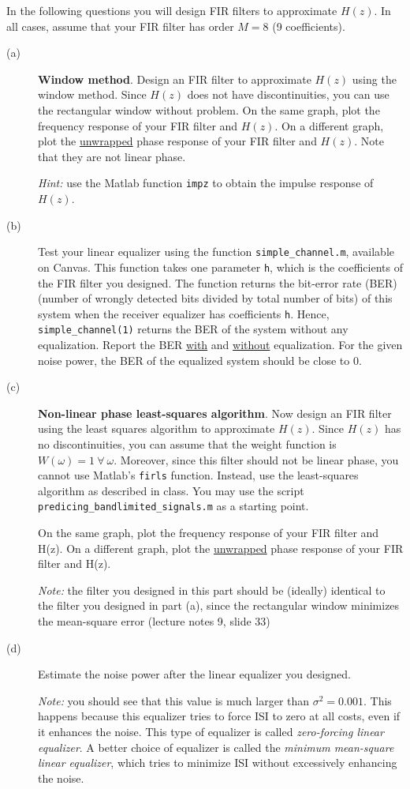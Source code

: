 \documentclass[12pt]{report}
\begin{document}
In the following questions you will design FIR filters to approximate $H(z)$. In all cases, assume that your FIR filter has order $M = 8$ (9 coefficients).
\begin{description}
	\item[(a)] \textbf{Window method}. Design an FIR filter to approximate $H(z)$ using the window method. Since $H(z)$ does not have discontinuities, you can use the rectangular window without problem. On the same graph, plot the frequency response of your FIR filter and $H(z)$. On a different graph, plot the \underline{unwrapped} phase response of your FIR filter and $H(z)$. Note that they are not linear phase.
	
	\textit{Hint:} use the Matlab function \texttt{impz} to obtain the impulse response of $H(z)$.
			
	\item[(b)] Test your linear equalizer using the function \texttt{simple\_channel.m}, available on Canvas. This function takes one parameter \texttt{h}, which is the coefficients of the FIR filter you designed. The function returns the bit-error rate (BER) (number of wrongly detected bits divided by total number of bits) of this system when the receiver equalizer has coefficients \texttt{h}. Hence, \texttt{simple\_channel(1)} returns the BER of the system without any equalization. Report the BER \underline{with} and \underline{without} equalization. For the given noise power, the BER of the equalized system should be close to 0. 
	\item[(c)] \textbf{Non-linear phase least-squares algorithm}. Now design an FIR filter using the least squares algorithm to approximate $H(z)$. Since $H(z)$ has no discontinuities, you can assume that the weight function is $W(\omega) = 1~\forall~\omega$. Moreover, since this filter should not be linear phase, you cannot use Matlab's \texttt{firls} function. Instead, use the least-squares algorithm as described in class. You may use the script \texttt{predicing\_bandlimited\_signals.m} as a starting point.
	
	On the same graph, plot the frequency response of your FIR filter and H(z). On a different graph, plot the \underline{unwrapped} phase response of your FIR filter and H(z).
	
	\textit{Note:} the filter you designed in this part should be (ideally) identical to the filter you designed in part (a), since the rectangular window minimizes the mean-square error (lecture notes 9, slide 33)
	
	\item[(d)] Estimate the noise power after the linear equalizer you designed.
	
	\textit{Note:} you should see that this value is much larger than $\sigma^2 = 0.001$. This happens because this equalizer tries to force ISI to zero at all costs, even if it enhances the noise. This type of equalizer is called \textit{zero-forcing linear equalizer}. A better choice of equalizer is called the \textit{minimum mean-square linear equalizer}, which tries to minimize ISI without excessively enhancing the noise.
	
\end{description}
\end{document}

